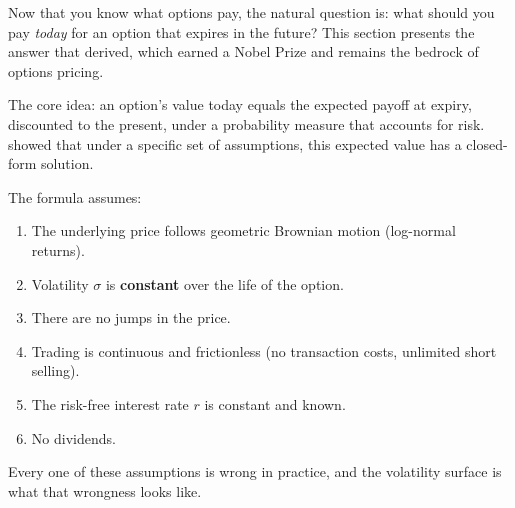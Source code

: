 Now that you know what options pay, the natural question is: what should you pay \emph{today} for an option that expires in the future?
This section presents the answer that \citet{Black1973} derived, which earned a Nobel Prize and remains the bedrock of options pricing.

The core idea: an option's value today equals the expected payoff at expiry, discounted to the present, under a probability measure that accounts for risk.
\citet{Black1973} showed that under a specific set of assumptions, this expected value has a closed-form solution.

\begin{keyidea}
The formula assumes:
\begin{enumerate}[nosep]
  \item The underlying price follows geometric Brownian motion (log-normal returns).
  \item Volatility $\sigma$ is \textbf{constant} over the life of the option.
  \item There are no jumps in the price.
  \item Trading is continuous and frictionless (no transaction costs, unlimited short selling).
  \item The risk-free interest rate $r$ is constant and known.
  \item No dividends.
\end{enumerate}
Every one of these assumptions is wrong in practice, and the volatility surface is what that wrongness looks like.
\end{keyidea}

